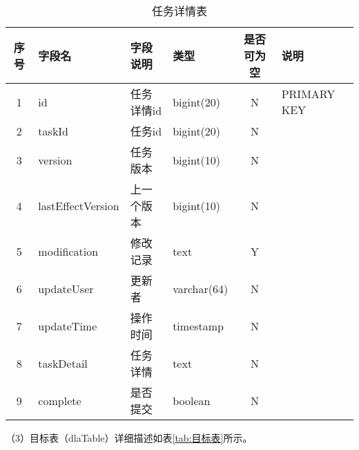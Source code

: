 \begin{table}[H]
  \centering
  \caption{任务详情表}
  \label{tab:任务详情表}
  \begin{tabular}{clllcl}
    \toprule
    序号  & 字段名              & 字段说明     & 类型           & 是否可为空   & 说明  \\
    \midrule
    1    & id                 & 任务详情id   & bigint(20)     & N          & PRIMARY KEY    \\
    2    & taskId             & 任务id      & bigint(20)     & N          &    \\
    3    & version            & 任务版本     & bigint(10)     & N          &   \\
    4    & lastEffectVersion  & 上一个版本   & bigint(10)     & N          &   \\
    5    & modification       & 修改记录     & text           & Y          &   \\
    6    & updateUser         & 更新者       & varchar(64)   & N          &    \\
    7    & updateTime         & 操作时间     & timestamp      & N          &   \\
    8    & taskDetail         & 任务详情     & text           & N          &   \\
    9    & complete           & 是否提交     & boolean        & N          &   \\
    \bottomrule
  \end{tabular}
\end{table}

（3）目标表（dlaTable）详细描述如表\ref{tab:目标表}所示。

